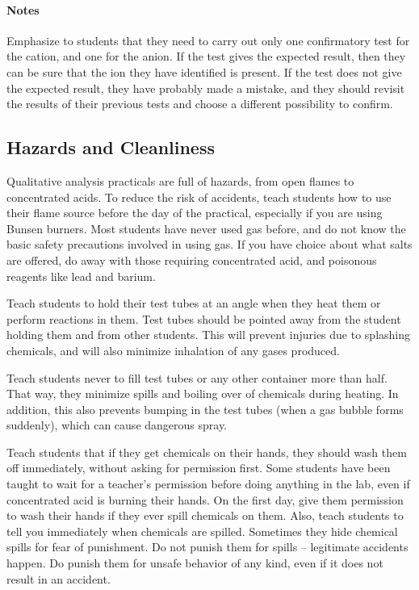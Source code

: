 \setcounter{secnumdepth}{2}
\paragraph{Notes}

Emphasize to students that they need to carry out only one confirmatory test for the cation, 
and one for the anion. If the test gives the expected result, then they can be sure that the ion they have identified is present. If the test does not give the expected result, they have probably made a mistake, and they should revisit the results of their previous tests 
and choose a different possibility to confirm.


\subsection{Hazards and Cleanliness}

Qualitative analysis practicals are full of hazards, 
from open flames to concentrated acids. 
To reduce the risk of accidents, 
teach students how to use their flame source 
before the day of the practical, 
especially if you are using Bunsen burners. 
Most students have never used gas before, 
and do not know the basic safety precautions involved in using gas. 
If you have choice about what salts are offered, 
do away with those requiring concentrated acid, and poisonous reagents like lead and barium.

Teach students to hold their test tubes at an angle when they heat them or perform reactions in them. Test tubes should be pointed away from the student holding them and from other students. 
This will prevent injuries due to splashing chemicals, and will also minimize inhalation of any gases produced.

Teach students never to fill test tubes or any other container more than half. That way, 
they minimize spills and boiling over of chemicals during heating. In addition, this also prevents bumping in the test tubes (when a gas bubble forms suddenly), which can cause dangerous spray.

Teach students that if they get chemicals on their hands, they should wash them off immediately, without asking for permission first. Some students have been taught to wait for a teacher's permission before doing anything in the lab, even if concentrated acid is burning their hands. On the first day, give them permission to wash their hands if they ever spill chemicals on them. Also, teach students to tell you immediately when chemicals are spilled. 
Sometimes they hide chemical spills for fear of punishment. Do not punish them for spills -- legitimate accidents happen. Do punish them for unsafe behavior of any kind, even if it does not result in an accident. 

